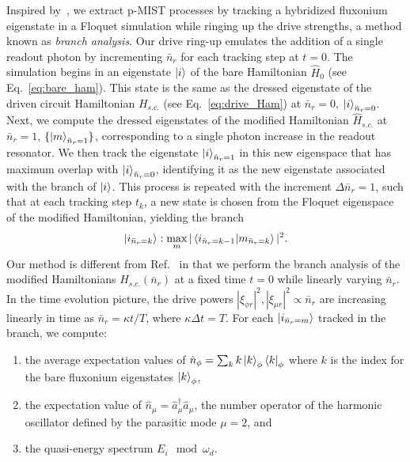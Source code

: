 \documentclass[%
reprint,
superscriptaddress,
 amsmath,amssymb,
 aps,
 prx,
longbibliography,
floatfix,
]{revtex4-2}
\begin{document}
Inspired by~\cite{dumas2024unified,cohen2023reminiscence}, we extract p-MIST processes by tracking a hybridized fluxonium eigenstate in a Floquet simulation while ringing up the drive strengths, a method known as \emph{branch analysis}. Our drive ring-up emulates the addition of a single readout photon by incrementing $\bar n_r$ for each tracking step at $t=0$. The simulation begins in an eigenstate $\ket{i}$ of the bare Hamiltonian $\hat{H}_0$ (see Eq.~\ref{eq:bare_ham}). This state is the same as the dressed eigenstate of the driven circuit Hamiltonian $H_{s.c.}$ (see Eq.~\ref{eq:drive_Ham}) at $\bar n_r=0$, $\ket{i}_{\bar n_r=0}$. Next, we compute the dressed eigenstates of the modified Hamiltonian $\hat{H}_{s.c.}$ at $\bar n_r=1$, $\{\ket{m}_{\bar n_r=1}\}$, corresponding to a single photon increase in the readout resonator. We then track the eigenstate $\ket{i}_{\bar n_r=1}$ in this new eigenspace that has maximum overlap with $\ket{i}_{\bar n_r=0}$, identifying it as the new eigenstate associated with the branch of $\ket{i}$. This process is repeated with the increment $\Delta \bar n_r=1$, such that at each tracking step $t_k$, a new state is chosen from the Floquet eigenspace of the modified Hamiltonian, yielding the branch
\begin{align}
\ket{i_{\bar n_r=k}}:\max_{m}|\braket{i_{\bar n_r=k-1}|{m}_{\bar n_r=k}}|^2.   
\end{align}
Our method is different from Ref.~\cite{dumas2024unified,cohen2023reminiscence} in that we perform the branch analysis of the modified Hamiltonians $H_{s.c.}(\bar n_r)$ at a fixed time $t=0$ while linearly varying $\bar n_r$. In the time evolution picture, the drive powers $|\xi_{\phi r}|^2,|\xi_{\mu r}|^2 \propto \bar n_r$ are increasing linearly in time as $\bar n_r= \kappa t/T$, where $\kappa \Delta t=T$. For each $\ket{i_{\bar n_r=m}}$ tracked in the branch, we compute:
\begin{enumerate}
    \item the average expectation values of $\hat n_\phi=\sum_k k\ket{k}_\phi\bra{k}_\phi$ where $k$ is the index for the bare fluxonium eigenstates $\ket{k}_\phi$,
    \item the expectation value of $\hat n_\mu=\hat a_{\mu}^\dagger \hat a_{\mu}$, the number operator of the harmonic oscillator defined by the parasitic mode $\mu=2$, and 
    \item the quasi-energy spectrum $E_i\mod \omega_d$.
\end{enumerate}
\end{document}
